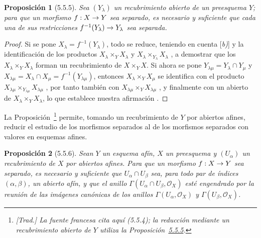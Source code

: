 \documentclass[oneside]{amsart}
\theoremstyle{ega-env-style}
\theoremstyle{ega-thm-env-style}
\newtheorem*{proposition}{Proposición}
\theoremstyle{ega-defn-env-style}
\renewcommand{\to}{\mathchoice{\longrightarrow}{\rightarrow}{\rightarrow}{\rightarrow}}
\newcommand{\oldpage}[2][]{{\marginnote{\normalfont{\textbf{#1}~|~#2}}}\ignorespaces}
\let\EGAOriginalLabel\label
\renewcommand{\label}[1]{\phantomsection\EGAOriginalLabel{#1}}
\begin{document}
\oldpage[I]{138}
\begin{proposition}[5.5.5]
\label{I.5.5.5}
Sea $(Y_\lambda)$ un recubrimiento abierto de un preesquema $Y$;
para que un morfismo $f:X\to Y$ sea separado, es necesario y suficiente que cada una de sus restricciones $f^{-1}(Y_\lambda)\to Y_\lambda$ sea separada.
\end{proposition}

\begin{proof}
Si se pone $X_\lambda=f^{-1}(Y_\lambda)$, todo se reduce, teniendo en cuenta [\textit{b)}] y la identificación de los productos $X_\lambda\times_Y X_\lambda$ y $X_\lambda\times_{Y_\lambda}X_\lambda$ , a demostrar que los $X_\lambda\times_Y X_\lambda$ forman un recubrimiento de $X\times_Y X$.
Si ahora se pone $Y_{\lambda\mu}=Y_\lambda\cap Y_\mu$ y $X_{\lambda\mu}=X_\lambda\cap X_\mu=f^{-1}(Y_{\lambda\mu})$, entonces $X_\lambda\times_Y X_\mu$ se identifica con el producto $X_{\lambda\mu}\times_{Y_{\lambda\mu}}X_{\lambda\mu}$ , por tanto también con $X_{\lambda\mu}\times_Y X_{\lambda\mu}$ , y finalmente con un abierto de $X_\lambda\times_Y X_\lambda$, lo que establece nuestra afirmación .
\end{proof}

La Proposición~\footnote{\emph{[Trad.] La fuente francesa cita aquí (5.5.4); la reducción mediante un recubrimiento abierto de $Y$ utiliza la Proposición~\hyperref[I.5.5.5]{5.5.5}.}} permite, tomando un recubrimiento de $Y$ por abiertos afines, reducir el estudio de los morfismos separados al de los morfismos separados con valores en esquemas afines.

\begin{proposition}[5.5.6]
\label{I.5.5.6}
Sean $Y$ un esquema \emph{afín}, $X$ un preesquema y $(U_\alpha)$ un recubrimiento de $X$ por abiertos afines.
Para que un morfismo $f:X\to Y$ sea separado, es necesario y suficiente que $U_\alpha\cap U_\beta$ sea, para todo par de índices $(\alpha,\beta)$, un abierto afín, \emph{y} que el anillo $\Gamma(U_\alpha\cap U_\beta,\mathscr{O}_X)$ esté engendrado por la reunión de las imágenes canónicas de los anillos $\Gamma(U_\alpha,\mathscr{O}_X)$ y $\Gamma(U_\beta,\mathscr{O}_X)$.
\end{proposition}
\end{document}
